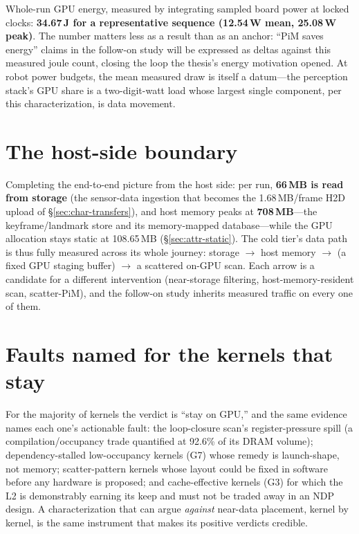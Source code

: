 Whole-run GPU energy, measured by integrating sampled board power at locked
clocks: \textbf{34.67\,J for a representative sequence (12.54\,W mean,
25.08\,W peak)}. The number matters less as a result than as an anchor:
``PiM saves energy'' claims in the follow-on study will be expressed as
deltas against this measured joule count, closing the loop the thesis's
energy motivation opened. At robot power budgets, the mean measured draw is
itself a datum---the perception stack's GPU share is a two-digit-watt load
whose largest single component, per this characterization, is data
movement.

\section{The host-side boundary}
\label{sec:syn-host}

Completing the end-to-end picture from the host side: per run, \textbf{66\,MB
is read from storage} (the sensor-data ingestion that becomes the
1.68\,MB/frame H2D upload of \S\ref{sec:char-transfers}), and host memory
peaks at \textbf{708\,MB}---the keyframe/landmark store and its
memory-mapped database---while the GPU allocation stays static at
108.65\,MB (\S\ref{sec:attr-static}). The cold tier's data path is thus
fully measured across its whole journey: storage $\rightarrow$ host memory
$\rightarrow$ (a fixed GPU staging buffer) $\rightarrow$ a scattered
on-GPU scan. Each arrow is a candidate for a different intervention
(near-storage filtering, host-memory-resident scan, scatter-PiM), and the
follow-on study inherits measured traffic on every one of them.

\section{Faults named for the kernels that stay}
\label{sec:syn-faults}

For the majority of kernels the verdict is ``stay on GPU,'' and the same
evidence names each one's actionable fault: the loop-closure scan's
register-pressure spill (a compilation/occupancy trade quantified at 92.6\%
of its DRAM volume); dependency-stalled low-occupancy kernels (G7) whose
remedy is launch-shape, not memory; scatter-pattern kernels whose layout
could be fixed in software before any hardware is proposed; and
cache-effective kernels (G3) for which the L2 is demonstrably earning its
keep and must not be traded away in an NDP design. A characterization that
can argue \emph{against} near-data placement, kernel by kernel, is the same
instrument that makes its positive verdicts credible.
